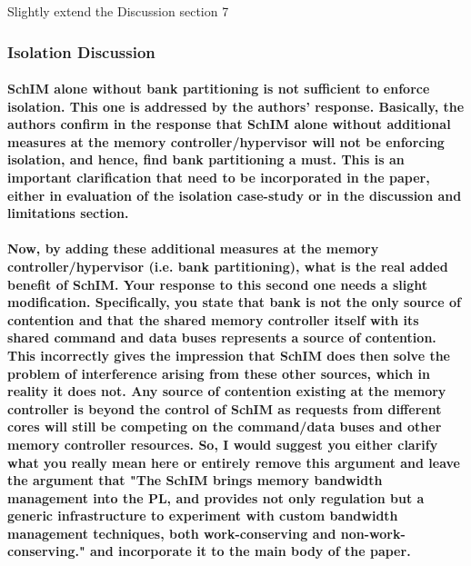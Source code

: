             Slightly extend the Discussion section 7

        \subsubsection{Isolation Discussion}
            \paragraph{SchIM alone without bank partitioning is not sufficient to enforce isolation. This one is addressed by the authors' response. Basically, the authors confirm in the response that SchIM alone without additional measures at the memory controller/hypervisor will not be enforcing isolation, and hence, find bank partitioning a must. This is an important clarification that need to be incorporated in the paper, either in evaluation of the isolation case-study or in the discussion and limitations section.}

            \paragraph{Now, by adding these additional measures at the memory controller/hypervisor (i.e. bank partitioning), what is the real added benefit of SchIM. Your response to this second one needs a slight modification. Specifically, you state that bank is not the only source of contention and that the shared memory controller itself with its shared command and data buses represents a source of contention. This incorrectly gives the impression that SchIM does then solve the problem of interference arising from these other sources, which in reality it does not. Any source of contention existing at the memory controller is beyond the control of SchIM as requests from different cores will still be competing on the command/data buses and other memory controller resources. So, I would suggest you either clarify what you really mean here or entirely remove this argument and leave the argument that "The SchIM brings memory bandwidth management into the PL, and provides not only regulation but a generic infrastructure to experiment with custom bandwidth management techniques, both work-conserving and non-work-conserving." and incorporate it to the main body of the paper.}
